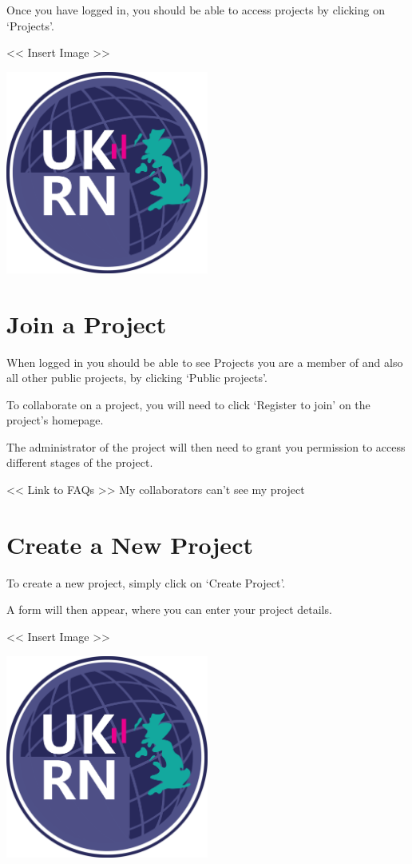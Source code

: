 \documentclass[]{book}
\begin{document}
Once you have logged in, you should be able to access projects by
clicking on `Projects'.

\textless{}\textless{} Insert Image \textgreater{}\textgreater{}

\includegraphics[width=0.50000\textwidth,height=0.50000\textwidth]{figs/evidence-triangle.png}

\chapter{Join a Project}\label{join}

When logged in you should be able to see Projects you are a member of
and also all other public projects, by clicking `Public projects'.

To collaborate on a project, you will need to click `Register to join'
on the project's homepage.

The administrator of the project will then need to grant you permission
to access different stages of the project.

\textless{}\textless{} Link to FAQs \textgreater{}\textgreater{} My
collaborators can't see my project

\chapter{Create a New Project}\label{createProject}

To create a new project, simply click on `Create Project'.

A form will then appear, where you can enter your project details.

\textless{}\textless{} Insert Image \textgreater{}\textgreater{}

\includegraphics[width=0.50000\textwidth,height=0.50000\textwidth]{figs/evidence-triangle.png}
\end{document}
